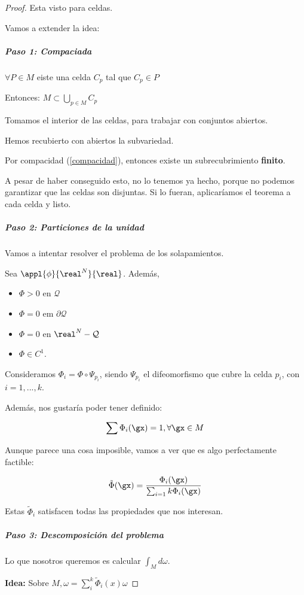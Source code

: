 \begin{proof}
Esta visto para celdas.

Vamos a extender la idea:


\subparagraph{Paso 1: Compaciada}
$\forall P\in M$ eiste una celda $C_p$ tal que $C_p\in P$

Entonces: $M\subset \displaystyle\bigcup_{p\in M} C_p$

Tomamos el interior de las celdas, para trabajar con conjuntos abiertos.

Hemos recubierto con abiertos la subvariedad.

Por compacidad (\ref{compacidad}), entonces existe un subrecubrimiento \textbf{finito}.

A pesar de haber conseguido esto, no lo tenemos ya hecho, porque no podemos garantizar que las celdas son disjuntas. Si lo fueran, aplicaríamos el teorema a cada celda y listo.

\subparagraph{Paso 2: Particiones de la unidad}

Vamos a intentar resolver el problema de los solapamientos.

Sea $\appl{\phi}{\real^N}{\real}$. Además, 
\begin{itemize}
\item $\Phi>0$ en $\mathcal{Q}$
\item $\Phi = 0$ em $\partial  \mathcal{Q}$
\item $\Phi = 0$ en $\real^N-\mathcal{Q}$
\item $\Phi\in C^1$.
\end{itemize}

Consideramos $\Phi_i = \Phi\circ\Psi_{p_i}$, siendo $\Psi_{p_i}$ el difeomorfismo que cubre la celda $p_i$, con $i=1,...,k$.

Además, nos gustaría poder tener definido:

\[\displaystyle \sum \Phi_{i}(\gx) = 1,\forall \gx \in M\]

Aunque parece una cosa imposible, vamos a ver que es algo perfectamente factible:

\[\tilde{\Phi}(\gx) = \frac{\Phi_i (\gx)}{\sum_{i=1}{k}\Phi_i(\gx)}\]

Estas $\tilde{\Phi}_i$ satisfacen todas las propiedades que nos interesan.

\subparagraph{Paso 3: Descomposición del problema}

Lo que nosotros queremos es calcular $\int_M d\omega$.


\textbf{Idea:} Sobre $M, \omega=\sum_i^k\tilde{\Phi}_i(x)\omega$


\end{proof}
